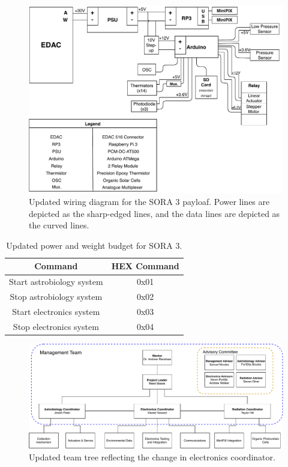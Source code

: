 \begin{figure}[H]
  \centering
  \includegraphics[width=\textwidth]{./Figures/WiringDiagram-Updated.pdf}
  \caption{Updated wiring diagram for the SORA 3 payloaf. Power lines are depicted as the sharp-edged lines, and the data lines are depicted as the curved lines.}
  \label{fig:WiringDiagram-Updated} 
\end{figure}

\begin{table}[H]
  \centering
  \caption{Updated power and weight budget for SORA 3.} 
  \label{tab:SerialCommands}
  \bigskip
  \begin{tabular}{cc}
    \hline
    \hline
    \multicolumn{1}{c}{Command} & \multicolumn{1}{c}{HEX Command} \\
    \hline
    Start astrobiology system & 0x01 \\
    Stop astrobiology system & 0x02 \\
    Start electronics system & 0x03 \\
    Stop electronics system & 0x04 \\
    \hline
    \hline
  \end{tabular}
\end{table}

\begin{figure}[H]
  \centering
  \includegraphics[width=\textwidth]{./Figures/TeamRoleTree-Updated.pdf}
  \caption{Updated team tree reflecting the change in electronics coordinator.}
  \label{fig:TeamRoleTree-Updated} 
\end{figure}

\newpage